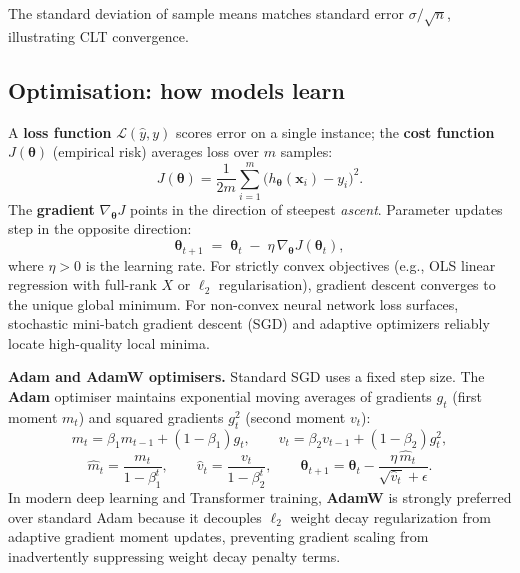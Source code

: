 \documentclass[11pt,a4paper]{article}
\begin{document}
	\begin{practicebox}

		The standard deviation of sample means matches standard error $\sigma/\sqrt{n}$, illustrating CLT convergence.
	\end{practicebox}
	
	\subsection{Optimisation: how models learn}
	
	A \textbf{loss function} $\mathcal{L}(\hat{y}, y)$ scores error on a single instance; the \textbf{cost function} $J(\boldsymbol{\theta})$ (empirical risk) averages loss over $m$ samples:
	\begin{equation}
		J(\boldsymbol{\theta}) = \frac{1}{2m}\sum_{i=1}^{m}
		\bigl(h_{\boldsymbol{\theta}}(\mathbf{x}_i) - y_i\bigr)^{2}.
	\end{equation}
	The \textbf{gradient} $\nabla_{\!\boldsymbol{\theta}} J$ points in the direction of steepest \emph{ascent}. Parameter updates step in the opposite direction:
	\begin{equation}
		\boldsymbol{\theta}_{t+1} \;=\;
		\boldsymbol{\theta}_t \;-\; \eta\,\nabla_{\!\boldsymbol{\theta}}
		J(\boldsymbol{\theta}_t),
		\label{eq:gd}
	\end{equation}
	where $\eta > 0$ is the learning rate. For strictly convex objectives (e.g., OLS linear regression with full-rank $X$ or $\ell_2$ regularisation), gradient descent converges to the unique global minimum. For non-convex neural network loss surfaces, stochastic mini-batch gradient descent (SGD) and adaptive optimizers reliably locate high-quality local minima.
	
	\textbf{Adam and AdamW optimisers.} Standard SGD uses a fixed step size. The \textbf{Adam} optimiser \parencite{kingma2015} maintains exponential moving averages of gradients $g_t$ (first moment $m_t$) and squared gradients $g_t^2$ (second moment $v_t$):
	\begin{equation}
		m_t = \beta_1 m_{t-1} + (1-\beta_1)g_t, \qquad
		v_t = \beta_2 v_{t-1} + (1-\beta_2)g_t^{2},
	\end{equation}
	\begin{equation}
		\hat{m}_t = \frac{m_t}{1-\beta_1^{t}}, \qquad
		\hat{v}_t = \frac{v_t}{1-\beta_2^{t}}, \qquad
		\boldsymbol{\theta}_{t+1} = \boldsymbol{\theta}_t - \frac{\eta\,\hat{m}_t}{\sqrt{\hat{v}_t} + \epsilon}.
	\end{equation}
	In modern deep learning and Transformer training, \textbf{AdamW} \parencite{loshchilov2019} is strongly preferred over standard Adam because it decouples $\ell_2$ weight decay regularization from adaptive gradient moment updates, preventing gradient scaling from inadvertently suppressing weight decay penalty terms.
\end{document}
